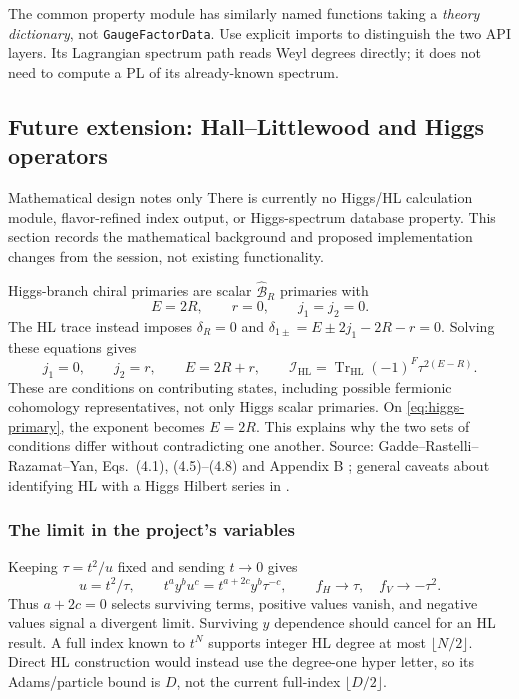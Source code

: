 \documentclass[11pt,a4paper]{article}
\numberwithin{equation}{section}
\newcommand{\code}[1]{{\small\nolinkurl{#1}}}
\newcommand{\Tr}{\operatorname{Tr}}
\newcommand{\HL}{\mathrm{HL}}
\newcommand{\src}[1]{{\small\color{muted}Source: #1.}\par}
\begin{document}
The common property module has similarly named functions taking a \emph{theory
dictionary}, not \code{GaugeFactorData}. Use explicit imports to distinguish the
two API layers. Its Lagrangian spectrum path reads Weyl degrees directly; it
does not need to compute a PL of its already-known spectrum.

\clearpage
\subsection{Future extension: Hall--Littlewood and Higgs operators}\label{sec:hl}
\begin{note}{Mathematical design notes only}
There is currently no Higgs/HL calculation module, flavor-refined index output,
or Higgs-spectrum database property. This section records the mathematical
background and proposed implementation changes from the session, not existing
functionality.
\end{note}
Higgs-branch chiral primaries are scalar $\widehat{\mathcal B}_R$ primaries with
\begin{equation}
 E=2R,\qquad r=0,\qquad j_1=j_2=0.
 \label{eq:higgs-primary}
\end{equation}
The HL trace instead imposes $\delta_R=0$ and
$\delta_{1\pm}=E\pm2j_1-2R-r=0$. Solving these equations gives
\begin{equation}
 j_1=0,\qquad j_2=r,\qquad E=2R+r,\qquad
 \mathcal I_\HL=\Tr_\HL(-1)^F\tau^{2(E-R)}.
 \label{eq:hl-trace}
\end{equation}
These are conditions on contributing states, including possible fermionic
cohomology representatives, not only Higgs scalar primaries. On
\eqref{eq:higgs-primary}, the exponent becomes $E=2R$. This explains why the
two sets of conditions differ without contradicting one another.
\src{Gadde--Rastelli--Razamat--Yan, Eqs.~(4.1), (4.5)--(4.8) and Appendix B
\cite{grry}; general caveats about identifying HL with a Higgs Hilbert series
in \cite{hl-caveat}}

\subsubsection{The limit in the project's variables}
Keeping $\tau=t^2/u$ fixed and sending $t\to0$ gives
\begin{equation}
 u=t^2/\tau,\qquad t^ay^bu^c=t^{a+2c}y^b\tau^{-c},\qquad
 f_H\longrightarrow\tau,\quad f_V\longrightarrow-\tau^2.
 \label{eq:hl-limit}
\end{equation}
Thus $a+2c=0$ selects surviving terms, positive values vanish, and negative
values signal a divergent limit. Surviving $y$ dependence should cancel for an
HL result. A full index known to $t^N$ supports integer HL degree at most
$\lfloor N/2\rfloor$. Direct HL construction would instead use the degree-one
hyper letter, so its Adams/particle bound is $D$, not the current full-index
$\lfloor D/2\rfloor$.
\end{document}
